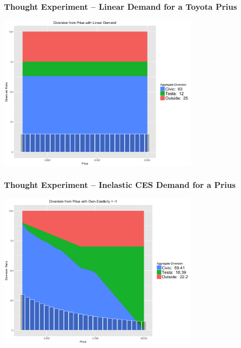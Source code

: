 \documentclass[xcolor=pdftex,dvipsnames,table,mathserif]{beamer}
\begin{document}

\begin{frame}
\frametitle{Thought Experiment -- Linear Demand for a Toyota Prius}
\begin{center}
\includegraphics[width=4in]{./resources/new_prius_linear.png}
\end{center}
\end{frame}

\begin{frame}
\frametitle{Thought Experiment -- Inelastic CES Demand for a Prius}
\begin{center}
\includegraphics[width=4in]{./resources/new_prius1.png}
\end{center}
\end{frame}
\end{document}
